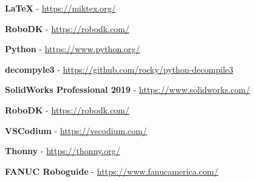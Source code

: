 \textbf{\LaTeX} - \href{https://miktex.org/}{https://miktex.org/}\newline

\textbf{RoboDK} - \href{https://robodk.com/}{https://robodk.com/}\newline

\textbf{Python} - \href{https://www.python.org/}{https://www.python.org/}\newline

\textbf{decompyle3} - \href{https://github.com/rocky/python-decompile3}{https://github.com/rocky/python-decompile3}\newline

\textbf{SolidWorks Professional 2019} - \href{https://www.solidworks.com/}{https://www.solidworks.com/}\newline

\textbf{RoboDK} - \href{https://robodk.com/}{https://robodk.com/}\newline

\textbf{VSCodium} - \href{https://vscodium.com/}{https://vscodium.com/}\newline

\textbf{Thonny} - \href{https://thonny.org/}{https://thonny.org/}\newline

\textbf{FANUC Roboguide} - \href{https://www.fanucamerica.com/products/robots/robot-simulation-software-FANUC-ROBOGUIDE}{https://www.fanucamerica.com/}\newline

